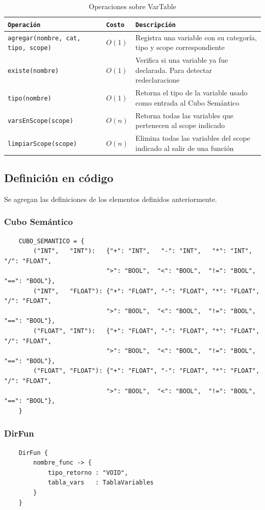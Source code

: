 \documentclass[12pt, letterpaper]{article}
\theoremstyle{definition}
\begin{document}
\begin{table}[H]
\centering
\caption{Operaciones sobre VarTable}
\label{tab:ops-vartable}
\begin{tabular}{|p{4cm}|p{2cm}|p{5.5cm}|}
    \hline
    \texttt{Operación} & \texttt{Costo} & \texttt{Descripción} \\
    \hline
    \texttt{agregar(nombre, cat, tipo, scope)} & $O(1)$ &
    Registra una variable con su categoría, tipo y scope correspondiente \\ \hline
    \texttt{existe(nombre)} & $O(1)$ &
    Verifica si una variable ya fue declarada. Para detectar redeclaracione \\ \hline
    \texttt{tipo(nombre)} & $O(1)$ &
    Retorna el tipo de la variable usado como entrada al Cubo Semántico\\ \hline
    \texttt{varsEnScope(scope)} & $O(n)$ &
    Retorna todas las variables que pertenecen al scope indicado\\ \hline
    \texttt{limpiarScope(scope)} & $O(n)$ &
    Elimina todas las variables del scope indicado al salir de una función\\ \hline
\end{tabular}
\end{table}


\subsection{Definición en código}
Se agregan las definiciones de los elementos definidos anteriormente.
%
\subsubsection{Cubo Semántico}
\begin{verbatim}
    CUBO_SEMANTICO = {
        ("INT",   "INT"):   {"+": "INT",   "-": "INT",   "*": "INT",   "/": "FLOAT",
                            ">": "BOOL",  "<": "BOOL",  "!=": "BOOL", "==": "BOOL"},
        ("INT",   "FLOAT"): {"+": "FLOAT", "-": "FLOAT", "*": "FLOAT", "/": "FLOAT",
                            ">": "BOOL",  "<": "BOOL",  "!=": "BOOL", "==": "BOOL"},
        ("FLOAT", "INT"):   {"+": "FLOAT", "-": "FLOAT", "*": "FLOAT", "/": "FLOAT",
                            ">": "BOOL",  "<": "BOOL",  "!=": "BOOL", "==": "BOOL"},
        ("FLOAT", "FLOAT"): {"+": "FLOAT", "-": "FLOAT", "*": "FLOAT", "/": "FLOAT",
                            ">": "BOOL",  "<": "BOOL",  "!=": "BOOL", "==": "BOOL"},
    }
\end{verbatim}
%
\subsubsection{DirFun}
\begin{verbatim}
    DirFun {
        nombre_func -> {
            tipo_retorno : "VOID",
            tabla_vars   : TablaVariables
        }
    }
\end{verbatim}
%
\end{document}
